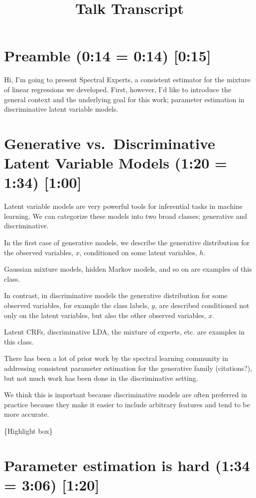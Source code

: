 \documentclass[tablecaption=bottom]{jmlr}
\title{Talk Transcript}
\author{\Name{Arun Tejasvi Chaganty} \Email{chaganty@stanford.edu}}
\begin{document}
\maketitle

\section{Preamble (0:14 = 0:14) {[}0:15{]}}

Hi, I'm going to present Spectral Experts, a consistent estimator for
the mixture of linear regressions we developed. First, however, I'd like
to introduce the general context and the underlying goal for this work;
parameter estimation in discriminative latent variable models.

\section{Generative vs.~Discriminative Latent Variable Models (1:20 =
1:34) {[}1:00{]}}

Latent variable models are very powerful tools for inferential tasks in
machine learning. We can categorize these models into two broad classes;
generative and discriminative.

In the first case of generative models, we describe the generative
distribution for the observed variables, $x$, conditioned on some latent
variables, $h$.

Gaussian mixture models, hidden Markov models, and so on are examples of
this class.

In contrast, in discriminative models the generative distribution for
some observed variables, for example the class labels, $y$, are
described conditioned not only on the latent variables, but also the
other observed variables, $x$.

Latent CRFs, discriminative LDA, the mixture of experts, etc. are
examples in this class.

There has been a lot of prior work by the spectral learning community in
addressing consistent parameter estimation for the generative family
(citations?), but not much work has been done in the discriminative
setting.

We think this is important because discriminative models are often
preferred in practice because they make it easier to include arbitrary
features and tend to be more accurate.

\{Highlight box\}

\section{Parameter estimation is hard (1:34 = 3:06) {[}1:20{]}}
\end{document}
